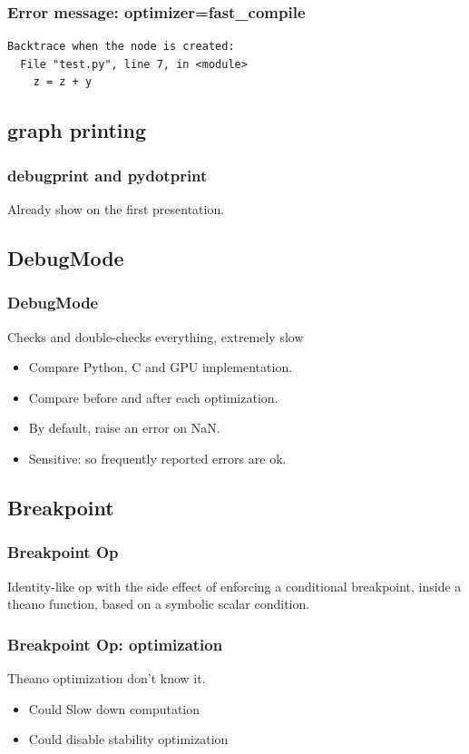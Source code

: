 \documentclass[utf8x,xcolor=pdftex,dvipsnames,table]{beamer}
\begin{document}
\begin{frame}[fragile]
  \frametitle{Error message: optimizer=fast\_compile}

\begin{lstlisting}
Backtrace when the node is created:
  File "test.py", line 7, in <module>
    z = z + y

\end{lstlisting}
\end{frame}

\subsection{graph printing}
\begin{frame}
  \frametitle{debugprint and pydotprint}
Already show on the first presentation.
\end{frame}

\subsection{DebugMode}
\begin{frame}[fragile]
  \frametitle{DebugMode}
    Checks and double-checks everything, extremely slow
\begin{itemize}
\item Compare Python, C and GPU implementation.
\item Compare before and after each optimization.
\item By default, raise an error on NaN.
\item Sensitive: so frequently reported errors are ok.
\end{itemize}
\end{frame}

\subsection{Breakpoint}
\begin{frame}[fragile]
  \frametitle{Breakpoint Op} Identity-like op with the side effect of
  enforcing a conditional breakpoint, inside a theano function, based
  on a symbolic scalar condition.
\end{frame}

\begin{frame}[fragile]
  \frametitle{Breakpoint Op: optimization}
  Theano optimization don't know it.
\begin{itemize}
  \item Could Slow down computation
  \item Could disable stability optimization
\end{itemize}
\end{frame}
\end{document}

